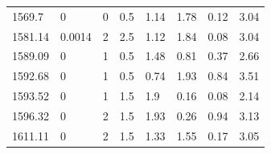 \begin{longtable}[!h] {p{} p{} p{} p{} p{} p{} p{} p{}}
	1569.7	&	0		&	0	&	0.5	&	1.14	&	1.78	&	0.12	&	3.04    \\
	1581.14	&	0.0014	&	2	&	2.5	&	1.12	&	1.84	&	0.08	&	3.04    \\
	1589.09	&	0		&	1	&	0.5	&	1.48	&	0.81	&	0.37	&	2.66    \\
	1592.68	&	0		&	1	&	0.5	&	0.74	&	1.93	&	0.84	&	3.51    \\
	1593.52	&	0		&	1	&	1.5	&	1.9		&	0.16	&	0.08	&	2.14    \\
	1596.32	&	0		&	2	&	1.5	&	1.93	&	0.26	&	0.94	&	3.13    \\
	1611.11	&	0		&	2	&	1.5	&	1.33	&	1.55	&	0.17	&	3.05 	\\


    \end{longtable}
    
\clearpage

